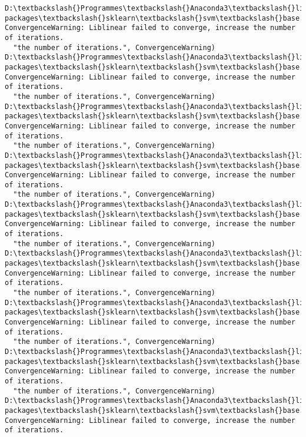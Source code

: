 \documentclass[11pt]{article}
\begin{document}
    \begin{Verbatim}[commandchars=\\\{\}]
D:\textbackslash{}Programmes\textbackslash{}Anaconda3\textbackslash{}lib\textbackslash{}site-packages\textbackslash{}sklearn\textbackslash{}svm\textbackslash{}base.py:922: ConvergenceWarning: Liblinear failed to converge, increase the number of iterations.
  "the number of iterations.", ConvergenceWarning)
D:\textbackslash{}Programmes\textbackslash{}Anaconda3\textbackslash{}lib\textbackslash{}site-packages\textbackslash{}sklearn\textbackslash{}svm\textbackslash{}base.py:922: ConvergenceWarning: Liblinear failed to converge, increase the number of iterations.
  "the number of iterations.", ConvergenceWarning)
D:\textbackslash{}Programmes\textbackslash{}Anaconda3\textbackslash{}lib\textbackslash{}site-packages\textbackslash{}sklearn\textbackslash{}svm\textbackslash{}base.py:922: ConvergenceWarning: Liblinear failed to converge, increase the number of iterations.
  "the number of iterations.", ConvergenceWarning)
D:\textbackslash{}Programmes\textbackslash{}Anaconda3\textbackslash{}lib\textbackslash{}site-packages\textbackslash{}sklearn\textbackslash{}svm\textbackslash{}base.py:922: ConvergenceWarning: Liblinear failed to converge, increase the number of iterations.
  "the number of iterations.", ConvergenceWarning)
D:\textbackslash{}Programmes\textbackslash{}Anaconda3\textbackslash{}lib\textbackslash{}site-packages\textbackslash{}sklearn\textbackslash{}svm\textbackslash{}base.py:922: ConvergenceWarning: Liblinear failed to converge, increase the number of iterations.
  "the number of iterations.", ConvergenceWarning)
D:\textbackslash{}Programmes\textbackslash{}Anaconda3\textbackslash{}lib\textbackslash{}site-packages\textbackslash{}sklearn\textbackslash{}svm\textbackslash{}base.py:922: ConvergenceWarning: Liblinear failed to converge, increase the number of iterations.
  "the number of iterations.", ConvergenceWarning)
D:\textbackslash{}Programmes\textbackslash{}Anaconda3\textbackslash{}lib\textbackslash{}site-packages\textbackslash{}sklearn\textbackslash{}svm\textbackslash{}base.py:922: ConvergenceWarning: Liblinear failed to converge, increase the number of iterations.
  "the number of iterations.", ConvergenceWarning)
D:\textbackslash{}Programmes\textbackslash{}Anaconda3\textbackslash{}lib\textbackslash{}site-packages\textbackslash{}sklearn\textbackslash{}svm\textbackslash{}base.py:922: ConvergenceWarning: Liblinear failed to converge, increase the number of iterations.
  "the number of iterations.", ConvergenceWarning)
D:\textbackslash{}Programmes\textbackslash{}Anaconda3\textbackslash{}lib\textbackslash{}site-packages\textbackslash{}sklearn\textbackslash{}svm\textbackslash{}base.py:922: ConvergenceWarning: Liblinear failed to converge, increase the number of iterations.

\end{Verbatim}
\end{document}

